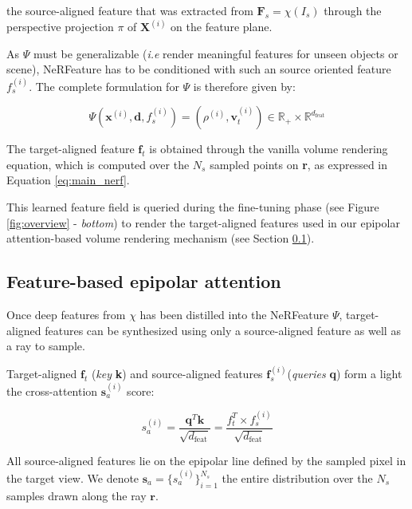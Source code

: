 the source-aligned feature that was extracted from $\mathbf{F}_{s}=\chi(I_{s})$ through the perspective projection $\pi$ of $\mathbf{X}^{(i)}$ on the feature plane.

As $\Psi$ must be generalizable (\textit{i.e} render meaningful features for unseen objects or scene), NeRFeature has to be conditioned with such an source oriented feature $f_{s}^{(i)}$. The complete formulation for $\Psi$ is therefore given by:

\begin{equation}
    \Psi(\mathbf{x}^{(i)},\mathbf{d},f_{s}^{(i)}) = (\rho^{(i)},\mathbf{v}_{t}^{(i)}) \in \mathbb{R}_{+}\times \mathbb{R}^{d_{\text{feat}}}
\end{equation}

The target-aligned feature $\mathbf{f}_{t}$ is obtained through the vanilla volume rendering equation, which is computed over the $N_s$ sampled points on \textbf{r}, as expressed in Equation \eqref{eq:main_nerf}.

This learned feature field is queried during the fine-tuning phase (see Figure \ref{fig:overview} - \textit{bottom}) to render the target-aligned features used in our epipolar attention-based volume rendering mechanism (see Section \ref{subsec:epipolar_att}). 

\subsection{Feature-based epipolar attention}
\label{subsec:epipolar_att}

Once deep features from $\chi$ has been distilled into the NeRFeature $\Psi$, target-aligned features can be synthesized using only a source-aligned feature as well as a ray to sample. 

Target-aligned $\mathbf{f}_{t}$ (\textit{key} \textbf{k}) and source-aligned features $\mathbf{f}_{s}^{(i)}$(\textit{queries} \textbf{q}) form a light the cross-attention \citep{vaswani2017attention} $\mathbf{s}_{a}^{(i)}$ score:

\begin{equation}
    s_{a}^{(i)} = \frac{\mathbf{q}^{T}\mathbf{k}}{\sqrt{d_{\text{feat}}}}= \frac{f_{t}^{T}\times f_{s}^{(i)}}{\sqrt{d_{\text{feat}}}}
\label{eq:attention}
\end{equation}

All source-aligned features lie on the epipolar line defined by the sampled pixel in the target view. We denote $\mathbf{s}_{a} = \{ s_{a}^{(i)}\}_{i=1}^{N_{s}}$ the entire distribution over the $N_s$ samples drawn along the ray $\mathbf{r}$.

